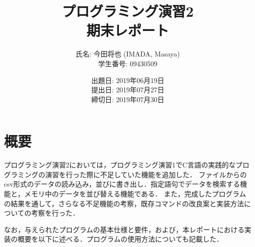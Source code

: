 \documentclass[a4j,11pt]{jarticle}
\title{プログラミング演習2 \\
       期末レポート}
\author{氏名: 今田将也 (IMADA, Masaya) \\
        学生番号: 09430509}
\date{出題日: 2019年06月19日 \\
      提出日: 2019年07月27日 \\
      締切日: 2019年07月30日 \\}  %
\begin{document}
\maketitle


\section{概要}\label{sec:gaiyou}

プログラミング演習2においては，プログラミング演習1でC言語の実践的なプログラミングの演習を行った際に不足していた機能を追加した．
ファイルからのcsv形式のデータの読み込み，並びに書き出し．指定語句でデータを検索する機能と，メモリ中のデータを並び替える機能である．
また，完成したプログラムの結果を通して，さらなる不足機能の考察，既存コマンドの改良案と実装方法についての考察を行った．


なお，与えられたプログラムの基本仕様と要件，および，本レポートにおける実装の概要を以下に述べる．プログラムの使用方法についても記載した．
\end{document}
